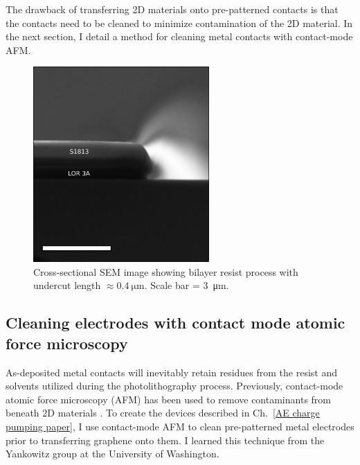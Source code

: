 \documentclass{beavtex_dub_edit}
\begin{document}
The drawback of transferring 2D materials onto pre-patterned contacts is that the contacts need to be cleaned to minimize contamination of the 2D material. In the next section, I detail a method for cleaning metal contacts with contact-mode AFM.


\begin{figure}
    \includegraphics[width = 0.6\textwidth]{LOR cross section_.png}
    \caption{Cross-sectional SEM image showing bilayer resist process with undercut length $\approx \SI{0.4}{\micro\meter}$. Scale bar = \SI{3}{\micro\meter}.}
    \label{fig:cross-section SEM}
\end{figure}

\subsection{Cleaning electrodes with contact mode atomic force microscopy} \label{AFM cleaning main section}

As-deposited metal contacts will inevitably retain residues from the resist and solvents utilized during the photolithography process. Previously, contact-mode atomic force microscopy (AFM) has been used to remove contaminants from beneath 2D materials \cite{goossens_mechanical_2012,chen_tip-based_2021}. To create the devices described in Ch.\ \ref{AE charge pumping paper}, I use contact-mode AFM to clean pre-patterned metal electrodes prior to transferring graphene onto them. I learned this technique from the Yankowitz group at the University of Washington.
\end{document}
